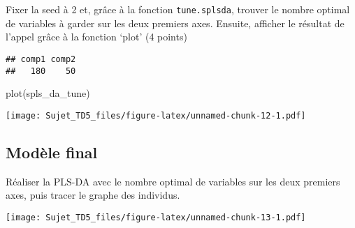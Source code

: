 \documentclass[
]{article}
\newenvironment{Shaded}{\begin{snugshade}}{\end{snugshade}}
\newcommand{\AttributeTok}[1]{\textcolor[rgb]{0.77,0.63,0.00}{#1}}
\newcommand{\ConstantTok}[1]{\textcolor[rgb]{0.00,0.00,0.00}{#1}}
\newcommand{\DecValTok}[1]{\textcolor[rgb]{0.00,0.00,0.81}{#1}}
\newcommand{\FunctionTok}[1]{\textcolor[rgb]{0.00,0.00,0.00}{#1}}
\newcommand{\NormalTok}[1]{#1}
\newcommand{\OtherTok}[1]{\textcolor[rgb]{0.56,0.35,0.01}{#1}}
\newcommand{\SpecialCharTok}[1]{\textcolor[rgb]{0.00,0.00,0.00}{#1}}
\newcommand{\StringTok}[1]{\textcolor[rgb]{0.31,0.60,0.02}{#1}}
\begin{document}
Fixer la seed à 2 et, grâce à la fonction \texttt{tune.splsda}, trouver
le nombre optimal de variables à garder sur les deux premiers axes.
Ensuite, afficher le résultat de l'appel grâce à la fonction `plot' (4
points)

\begin{Shaded}
\end{Shaded}

\begin{verbatim}
## comp1 comp2 
##   180    50
\end{verbatim}

\begin{Shaded}
\begin{Highlighting}[]
\FunctionTok{plot}\NormalTok{(spls\_da\_tune)}
\end{Highlighting}
\end{Shaded}

\texttt{[image: Sujet\_TD5\_files/figure-latex/unnamed-chunk-12-1.pdf]}

\hypertarget{moduxe8le-final}{%
\subsection{Modèle final}\label{moduxe8le-final}}

Réaliser la PLS-DA avec le nombre optimal de variables sur les deux
premiers axes, puis tracer le graphe des individus.

\begin{Shaded}
\end{Shaded}

\texttt{[image: Sujet\_TD5\_files/figure-latex/unnamed-chunk-13-1.pdf]}
\end{document}
